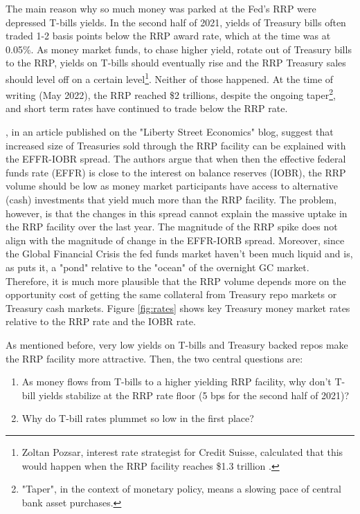 \documentclass[11pt,a4paper,english,oneside]{article}
\begin{document}
The main reason why so much money was parked at the Fed's RRP were depressed T-bills yields. In the second half of 2021, yields of Treasury bills often traded 1-2 basis points below the RRP award rate, which at the time was at 0.05\%. As money market funds, to chase higher yield, rotate out of Treasury bills to the RRP, yields on T-bills should eventually rise and the RRP Treasury sales should level off on a certain level\footnote{Zoltan Pozsar, interest rate strategist for Credit Suisse, calculated that this would happen when the RRP facility reaches \$1.3 trillion \citep{gmd070721}.}. Neither of those happened. At the time of writing (May 2022), the RRP reached \$2 trillions, despite the ongoing taper\footnote{"Taper", in the context of monetary policy, means a slowing pace of central bank asset purchases.}, and short term rates have continued to trade below the RRP rate.

\citet{alfonso2022}, in an article published on the "Liberty Street Economics" blog, suggest that increased size of Treasuries sold through the RRP facility can be explained with the EFFR-IOBR spread. The authors argue that when then the effective federal funds rate (EFFR) is close to the interest on balance reserves (IOBR), the RRP volume should be low as money market participants have access to alternative (cash) investments that yield much more than the RRP facility. The problem, however, is that the changes in this spread cannot explain the massive uptake in the RRP facility over the last year. The magnitude of the RRP spike does not align with the magnitude of change in the EFFR-IORB spread. Moreover, since the Global Financial Crisis the fed funds market haven't been much liquid and is, as \citet{gmn22} puts it, a "pond" relative to the "ocean" of the overnight GC market. Therefore, it is much more plausible that the RRP volume depends more on the opportunity cost of getting the same collateral from Treasury repo markets or Treasury cash markets. Figure \ref{fig:rates} shows key Treasury money market rates relative to the RRP rate and the IOBR rate.

As mentioned before, very low yields on T-bills and Treasury backed repos make the RRP facility more attractive. Then, the two central questions are:
\begin{enumerate}
  \item As money flows from T-bills to a higher yielding RRP facility, why don't T-bill yields stabilize at the RRP rate floor (5 bps for the second half of 2021)?
  \item Why do T-bill rates plummet so low in the first place?
\end{enumerate}
\end{document}
